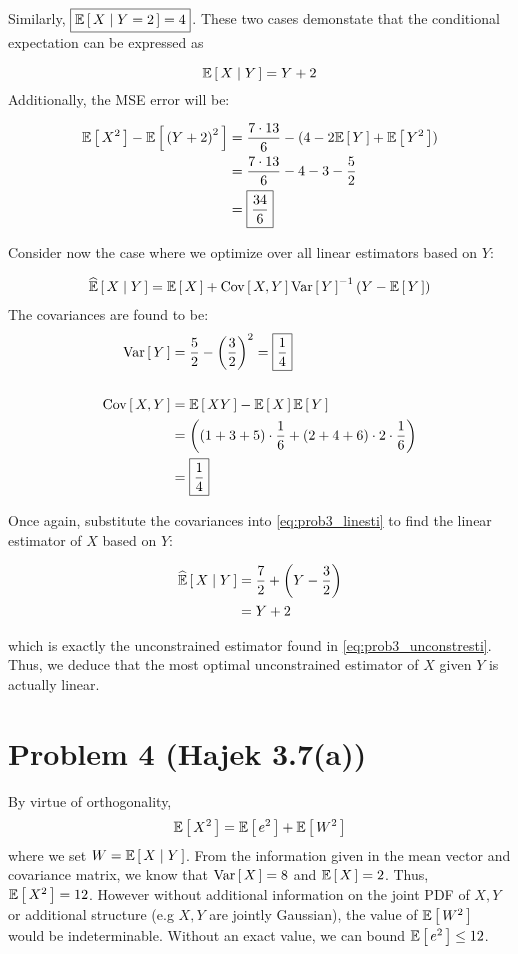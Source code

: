 \documentclass[12pt]{article}%
\begin{document}
Similarly, $\boxed{\mathbb{E}\left[\,{X}\mid {Y = 2}\,\right] = 4}$. These two cases demonstate that the conditional expectation can be expressed as

\begin{equation}
  \mathbb{E}\left[\,{X}\mid {Y}\,\right] = Y + 2 \label{eq:prob3_unconstresti}
\end{equation}
Additionally, the MSE error will be:

\begin{align*}
  \mathbb{E}\left[\,X^2\,\right] - \mathbb{E}\left[\,\left(Y + 2\right)^2\,\right] & = \frac{7 \cdot 13}{6} - (4 - 2\mathbb{E}\left[\,Y\,\right] + \mathbb{E}\left[\,Y^2\,\right]) \\
  & =\frac{7 \cdot 13}{6} - 4 - 3 - \frac{5}{2} \\
  & = \boxed{\frac{34}{6}}
\end{align*}

Consider now the case where we optimize over all linear estimators based on $Y$:

\begin{align}
  \widehat{ \mathbb{E}}\left[\,{X} \mid {Y}\,\right] = \mathbb{E}\left[\,X\,\right] + \text{Cov}\left[\,X,Y\,\right]\text{Var}\left[\,Y\,\right]^{-1}\left(Y - \mathbb{E}\left[\,Y\,\right]\right) \label{eq:prob3_linesti}
\end{align}
The covariances are found to be:
\begin{align*}
\text{Var}\left[\,Y\,\right] & = \frac{5}{2} - \left(\frac{3}{2}\right)^2 = \boxed{\frac{1}{4}} \\
\\
\text{Cov}\left[\,X,Y\,\right] & = \mathbb{E}\left[\,XY\,\right] - \mathbb{E}\left[\,X\,\right]\mathbb{E}\left[\,Y\,\right] \\
           & = \left((1+3+5)\cdot \frac{1}{6} + (2 + 4 + 6)\cdot 2 \cdot \frac{1}{6}\right) \\
           & = \boxed{\frac{1}{4}}
\end{align*}

Once again, substitute the covariances into \ref{eq:prob3_linesti} to find the linear estimator of $X$ based on $Y$:

\begin{align}
  \widehat{ \mathbb{E}}\left[\,{X} \mid {Y}\,\right] & = \frac{7}{2} + \left(Y - \frac{3}{2}\right) \\
          & = Y + 2
\end{align}

which is exactly the unconstrained estimator found in \ref{eq:prob3_unconstresti}. Thus, we deduce that the most optimal unconstrained estimator of $X$ given $Y$ is actually linear.

\section{Problem 4 (Hajek 3.7(a))}
By virtue of orthogonality, \[\mathbb{E}\left[\,X^2\,\right] = \mathbb{E}\left[\,e^2\,\right] + \mathbb{E}\left[\,W^2\,\right]\]
where we set $W = \mathbb{E}\left[\,{X}\mid {Y}\,\right]$. From the information given in the mean vector and covariance matrix, we know that $\text{Var}\left[\,X\,\right] = 8$ and $\mathbb{E}\left[\,X\,\right] = 2$. Thus, $\mathbb{E}\left[\,X^2\,\right] = 12$. However without additional information on the joint PDF of $X,Y$ or additional structure (e.g $X,Y$ are jointly Gaussian), the value of $\mathbb{E}\left[\,W^2\,\right]$ would be indeterminable. Without an exact value, we can bound $\mathbb{E}\left[\,e^2\,\right]\leq 12$.
\end{document}
